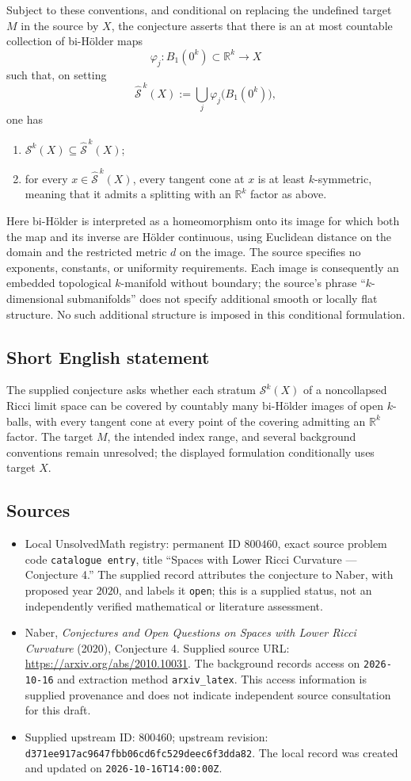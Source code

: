 \documentclass[11pt]{article}
\newcommand{\R}{\mathbb{R}}
\begin{document}
Subject to these conventions, and conditional on replacing the undefined target \(M\) in the source by \(X\), the conjecture asserts that there is an at most countable collection of bi-H\"older maps
\[
\varphi_j:B_1(0^k)\subset\R^k\longrightarrow X
\]
such that, on setting
\[
\widehat{\mathcal S}^{\,k}(X)
:=\bigcup_j\varphi_j\bigl(B_1(0^k)\bigr),
\]
one has
\begin{enumerate}
\item \(\mathcal S^k(X)\subseteq\widehat{\mathcal S}^{\,k}(X)\);
\item for every \(x\in\widehat{\mathcal S}^{\,k}(X)\), every tangent cone at \(x\) is at least \(k\)-symmetric, meaning that it admits a splitting with an \(\R^k\) factor as above.
\end{enumerate}
Here bi-H\"older is interpreted as a homeomorphism onto its image for which both the map and its inverse are H\"older continuous, using Euclidean distance on the domain and the restricted metric \(d\) on the image. The source specifies no exponents, constants, or uniformity requirements. Each image is consequently an embedded topological \(k\)-manifold without boundary; the source's phrase ``\(k\)-dimensional submanifolds'' does not specify additional smooth or locally flat structure. No such additional structure is imposed in this conditional formulation.
\subsection{Short English statement}
The supplied conjecture asks whether each stratum \(\mathcal S^k(X)\) of a noncollapsed Ricci limit space can be covered by countably many bi-H\"older images of open \(k\)-balls, with every tangent cone at every point of the covering admitting an \(\R^k\) factor. The target \(M\), the intended index range, and several background conventions remain unresolved; the displayed formulation conditionally uses target \(X\).
\subsection{Sources}
\begin{itemize}
\item Local UnsolvedMath registry: permanent ID \(800460\), exact source problem code \texttt{catalogue entry}, title ``Spaces with Lower Ricci Curvature --- Conjecture 4.'' The supplied record attributes the conjecture to Naber, with proposed year \(2020\), and labels it \texttt{open}; this is a supplied status, not an independently verified mathematical or literature assessment.
\item Naber, \emph{Conjectures and Open Questions on Spaces with Lower Ricci Curvature} (2020), Conjecture 4. Supplied source URL: \url{https://arxiv.org/abs/2010.10031}. The background records access on \texttt{2026-10-16} and extraction method \texttt{arxiv\_latex}. This access information is supplied provenance and does not indicate independent source consultation for this draft.
\item Supplied upstream ID: \(800460\); upstream revision: \texttt{d371ee917ac9647fbb06cd6fc529deec6f3dda82}. The local record was created and updated on \texttt{2026-10-16T14:00:00Z}.
\end{itemize}
\end{document}
